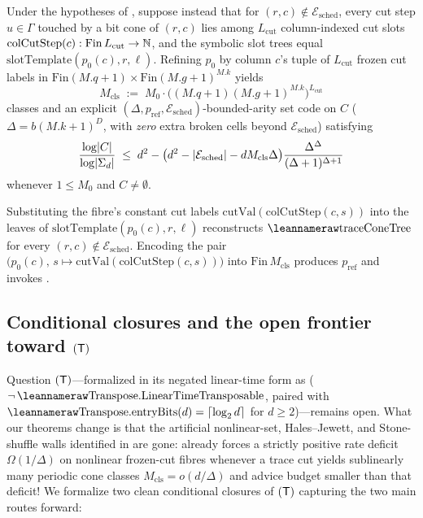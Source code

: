 \begin{theorem}\label{thm:sweep-cut-refined}
Under the hypotheses of , suppose instead that for $(r,c) \notin
\mathcal{E}_{\mathrm{sched}}$, every cut step $u \in \Gamma$ touched by a bit cone of $(r,c)$ lies
among $L_{\mathrm{cut}}$ column-indexed cut slots $\mathrm{colCutStep}(c) :
\mathrm{Fin}\,L_{\mathrm{cut}} \to \mathbb{N}$, and the symbolic slot trees  equal
$\mathrm{slotTemplate}(p_0(c), r, \ell)$. Refining $p_0$ by column $c$'s tuple of $L_{\mathrm{cut}}$
frozen cut labels in $\mathrm{Fin}(M.q + 1) \times \mathrm{Fin}(M.g + 1)^{M.k}$ yields
\[
  M_{\mathrm{cls}} \;:=\; M_0 \cdot \bigl((M.q + 1)(M.g + 1)^{M.k}\bigr)^{L_{\mathrm{cut}}}
\]
classes and an explicit $(\Delta, p_{\mathrm{ref}}, \mathcal{E}_{\mathrm{sched}})$-bounded-arity set
code on $C$ ($\Delta = b(M.k+1)^D$, with \emph{zero} extra broken cells beyond
$\mathcal{E}_{\mathrm{sched}}$) satisfying
\[
  \frac{\log\lvert C \rvert}{\log\lvert \Sigma_d \rvert}
  \;\le\;
  d^2 - \bigl(d^2 - \lvert \mathcal{E}_{\mathrm{sched}} \rvert - d M_{\mathrm{cls}} \Delta\bigr)
  \frac{\Delta^\Delta}{(\Delta+1)^{\Delta+1}}
\]
whenever $1 \le M_0$ and $C \ne \emptyset$.
\end{theorem}
\begin{outline}
Substituting the fibre's constant cut labels $\mathrm{cutVal}(\mathrm{colCutStep}(c, s))$ into the
leaves of $\mathrm{slotTemplate}(p_0(c), r, \ell)$ reconstructs $\lean{traceConeTree}$ for every
$(r,c) \notin \mathcal{E}_{\mathrm{sched}}$. Encoding the pair
$\bigl(p_0(c),\, s \mapsto \mathrm{cutVal}(\mathrm{colCutStep}(c,s))\bigr)$ into
$\mathrm{Fin}\,M_{\mathrm{cls}}$ produces $p_{\mathrm{ref}}$ and invokes .
\end{outline}

\subsection{Conditional closures and the open frontier toward \texorpdfstring{$(\mathsf{T})$}{(T)}}\label{sec:frontier}

Question $(\mathsf{T})$---formalized in its negated linear-time form as
 ($\neg\,\leanname{Transpose.LinearTimeTransposable}$, paired
with $\leanname{Transpose.entryBits}(d) = \clog{d}$ for $d \ge 2$)---remains open. What our theorems
change is that the artificial nonlinear-set, Hales--Jewett, and Stone-shuffle walls identified in
\cite{SeventeenthPaper2026,SharedDecoders2026} are gone:  already forces a
strictly positive rate deficit $\Omega(1/\Delta)$ on nonlinear frozen-cut fibres whenever a trace
cut yields sublinearly many periodic cone classes $M_{\mathrm{cls}} = o(d/\Delta)$ and advice budget
smaller than that deficit! We formalize two clean conditional closures of $(\mathsf{T})$ capturing the two
main routes forward:

